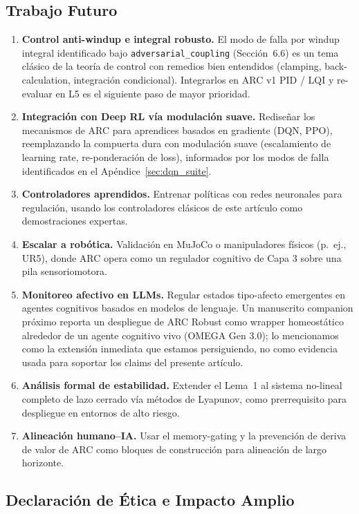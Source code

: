 \documentclass{article}
\begin{document}
\subsection{Trabajo Futuro}\label{sec:future_work}

\begin{enumerate}
    \item \textbf{Control anti-windup e integral robusto.} El modo de falla por windup integral identificado bajo \texttt{adversarial\_coupling} (Sección~6.6) es un tema clásico de la teoría de control con remedios bien entendidos (clamping, back-calculation, integración condicional). Integrarlos en ARC v1 PID / LQI y re-evaluar en L5 es el siguiente paso de mayor prioridad.
    \item \textbf{Integración con Deep RL vía modulación suave.} Rediseñar los mecanismos de ARC para aprendices basados en gradiente (DQN, PPO), reemplazando la compuerta dura con modulación suave (escalamiento de learning rate, re-ponderación de loss), informados por los modos de falla identificados en el Apéndice~\ref{sec:dqn_suite}.
    \item \textbf{Controladores aprendidos.} Entrenar políticas con redes neuronales para regulación, usando los controladores clásicos de este artículo como demostraciones expertas.
    \item \textbf{Escalar a robótica.} Validación en MuJoCo o manipuladores físicos (p.\ ej., UR5), donde ARC opera como un regulador cognitivo de Capa 3 sobre una pila sensoriomotora.
    \item \textbf{Monitoreo afectivo en LLMs.} Regular estados tipo-afecto emergentes en agentes cognitivos basados en modelos de lenguaje. Un manuscrito companion próximo \cite{Damian2026b} reporta un despliegue de ARC Robust como wrapper homeostático alrededor de un agente cognitivo vivo (OMEGA Gen 3.0); lo mencionamos como la extensión inmediata que estamos persiguiendo, no como evidencia usada para soportar los claims del presente artículo.
    \item \textbf{Análisis formal de estabilidad.} Extender el Lema~1 al sistema no-lineal completo de lazo cerrado vía métodos de Lyapunov, como prerrequisito para despliegue en entornos de alto riesgo.
    \item \textbf{Alineación humano--IA.} Usar el memory-gating y la prevención de deriva de valor de ARC como bloques de construcción para alineación de largo horizonte.
\end{enumerate}

\subsection{Declaración de Ética e Impacto Amplio}
\end{document}

